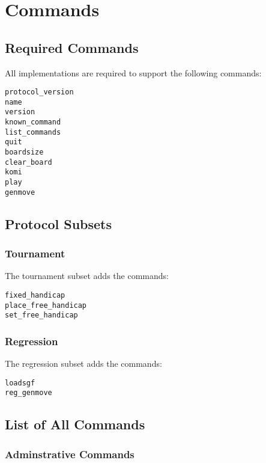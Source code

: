 \documentclass[a4paper]{article}
\begin{document}
\newpage
\section{Commands}
\label{sec:commands}
\subsection{Required Commands}
All implementations are required to support the following commands:

\begin{verbatim}
protocol_version
name
version
known_command
list_commands
quit
boardsize
clear_board
komi
play
genmove
\end{verbatim}

\subsection{Protocol Subsets}
\subsubsection{Tournament}
The tournament subset adds the commands:
\begin{verbatim}
fixed_handicap
place_free_handicap
set_free_handicap
\end{verbatim}


\subsubsection{Regression}
The regression subset adds the commands:
\begin{verbatim}
loadsgf
reg_genmove
\end{verbatim}


\subsection{List of All Commands}
\label{sec:list-of-all-commands}

\subsubsection{Adminstrative Commands}
\end{document}
